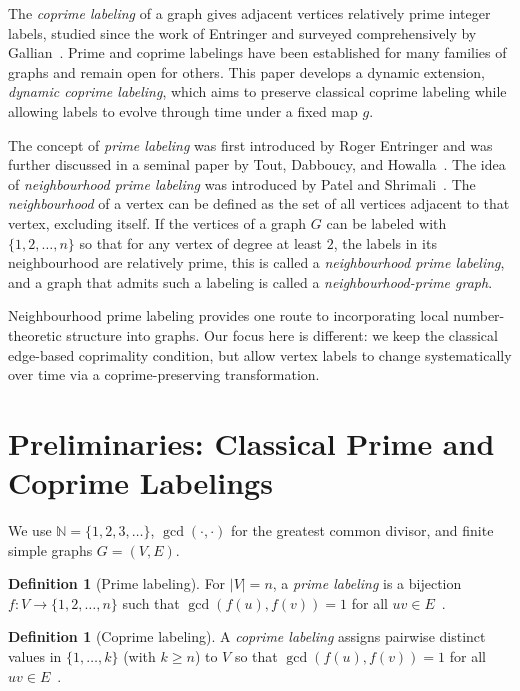 \documentclass[12pt]{amsart}
\theoremstyle{plain}
\theoremstyle{definition}
\newtheorem{defn}[thm]{Definition}
\theoremstyle{remark}
\numberwithin{equation}{section}
\begin{document}
The \emph{coprime labeling} of a graph gives adjacent vertices relatively prime integer labels, studied since the work of Entringer and surveyed comprehensively by Gallian~\cite{gallian}. Prime and coprime labelings have been established for many families of graphs and remain open for others. This paper develops a dynamic extension, \emph{dynamic coprime labeling}, which aims to preserve classical coprime labeling while allowing labels to evolve through time under a fixed map $g$.

The concept of \emph{prime labeling} was first introduced by Roger Entringer and was further discussed in a seminal paper by Tout, Dabboucy, and Howalla~\cite{tout}. The idea of \emph{neighbourhood prime labeling} was introduced by Patel and Shrimali~\cite{patel}. The \emph{neighbourhood} of a vertex can be defined as the set of all vertices adjacent to that vertex, excluding itself. If the vertices of a graph $G$ can be labeled with $\{1,2,\ldots, n\}$ so that for any vertex of degree at least $2$, the labels in its neighbourhood are relatively prime, this is called a \emph{neighbourhood prime labeling}, and a graph that admits such a labeling is called a \emph{neighbourhood-prime graph}.

Neighbourhood prime labeling provides one route to incorporating local number-theoretic structure into graphs. Our focus here is different: we keep the classical edge-based coprimality condition, but allow vertex labels to change systematically over time via a coprime-preserving transformation.

\section{Preliminaries: Classical Prime and Coprime Labelings}
We use $\mathbb{N}=\{1,2,3,\dots\}$, $\gcd(\cdot,\cdot)$ for the greatest common divisor, and finite simple graphs $G=(V,E)$.

\begin{defn}[Prime labeling]\label{def:prime}
For $|V|=n$, a \emph{prime labeling} is a bijection $f:V\to\{1,2,\dots,n\}$ such that $\gcd(f(u),f(v))=1$ for all $uv\in E$~\cite{gallian}.
\end{defn}

\begin{defn}[Coprime labeling]\label{def:coprime}
A \emph{coprime labeling} assigns pairwise distinct values in $\{1,\dots,k\}$ (with $k\ge n$) to $V$ so that $\gcd(f(u),f(v))=1$ for all $uv\in E$~\cite{berliner}.
\end{defn}
\end{document}
